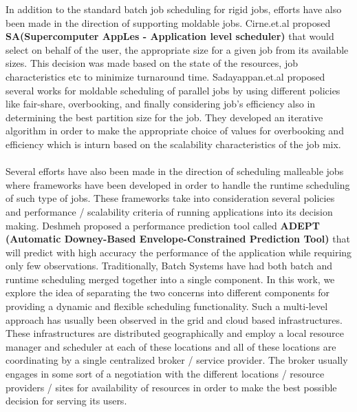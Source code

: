 In addition to the standard batch job scheduling for rigid jobs, efforts have also been made in the direction of supporting moldable jobs. Cirne.et.al\cite{wcirne} proposed \textbf{SA(Supercomputer AppLes - Application level scheduler)} that would select on behalf of the user, the appropriate size for a given job from its available sizes. This decision was made based on the state of the resources, job characteristics etc to minimize turnaround time. Sadayappan.et.al\cite{sabin}\cite{srividya}\cite{sudha} proposed several works for moldable scheduling of parallel jobs by using different policies like fair-share, overbooking, and finally considering job's efficiency also in determining the best partition size for the job. They developed an iterative algorithm in order to make the appropriate choice of values for overbooking and efficiency which is inturn based on the scalability characteristics of the job mix.\\ \\
Several efforts have also been made in the direction of scheduling malleable jobs where frameworks have been developed in order to handle the runtime scheduling of such type of jobs. These frameworks take into consideration several policies and performance / scalability criteria of running applications into its decision making. Deshmeh\cite{deshmeh} proposed a performance prediction tool called \textbf{ADEPT (Automatic Downey-Based Envelope-Constrained Prediction Tool)} that will predict with high accuracy the performance of the application while requiring only few observations. 
Traditionally, Batch Systems have had both batch and runtime scheduling merged together into a single component. In this work, we explore the idea of separating the two concerns into different components for providing a dynamic and flexible scheduling functionality. Such a multi-level approach has usually been observed in the grid and cloud based infrastructures\cite{kwang}\cite{kurowski}\cite{streit}. These infrastructures are distributed geographically and employ a local resource manager and scheduler at each of these locations and all of these locations are coordinating by a single centralized broker / service provider. The broker usually engages in some sort of a negotiation\cite{oliver}\cite{roland}\cite{viktor}\cite{rizos} with the different locations / resource providers / sites for availability of resources in order to make the best possible decision for serving its users.
